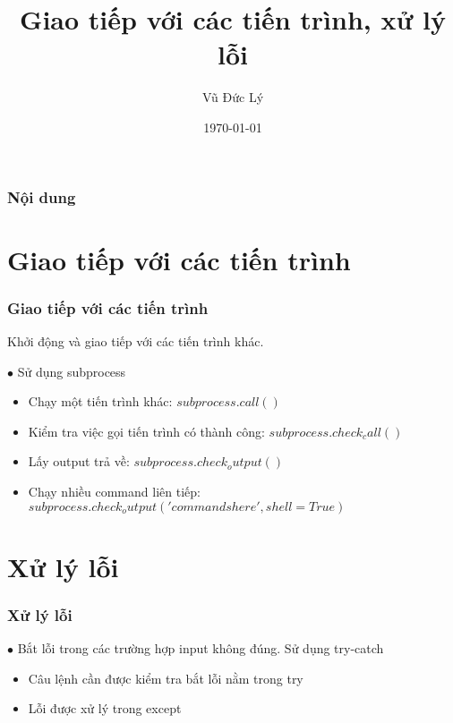 \documentclass{beamer}
\title[Giao tiếp với các tiến trình, xử lý lỗi ]{Giao tiếp với các tiến trình, xử lý lỗi } %
\author{Vũ Đức Lý} %
\date{\today} %
\begin{document}
\begin{frame}
\titlepage %
\hyperlink{intro}{}
\end{frame}

\begin{frame}[label=intro]
\frametitle{Nội dung} %
\tableofcontents %
\end{frame}


\section{Giao tiếp với các tiến trình} 
\begin{frame}[label=subprocess]
\frametitle{Giao tiếp với các tiến trình}
Khởi động và giao tiếp với các tiến trình khác. 

$\bullet$ Sử dụng subprocess
\begin{itemize}
\item Chạy một tiến trình khác: $subprocess.call()$
\item Kiểm tra việc gọi tiến trình có thành công: $subprocess.check_call()$
\item Lấy output trả về: $subprocess.check_output()$
\item Chạy nhiều command liên tiếp: $subprocess.check_output('commands here', shell = True)$
\end{itemize} 
\hyperlink{intro}{}
\hyperlink{moitruong}{}
\end{frame}

\section{Xử lý lỗi}
\begin{frame}[label=error]
\frametitle{Xử lý lỗi}
$\bullet$ Bắt lỗi trong các trường hợp input không đúng. Sử dụng try-catch
\begin{itemize}
\item Câu lệnh cần được kiểm tra bắt lỗi nằm trong try
\item Lỗi được xử lý trong except
\end{itemize}

\hyperlink{teptin}{}
\end{frame}
\end{document}
